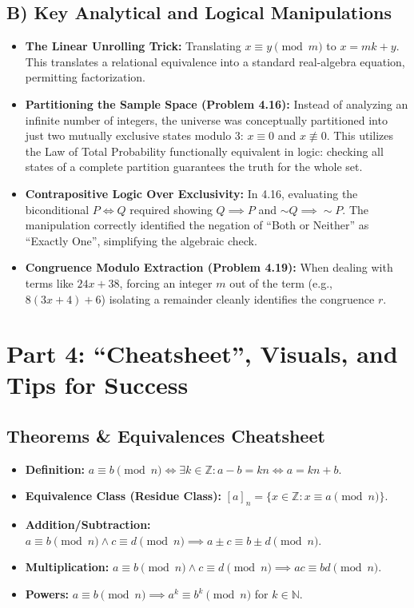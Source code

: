 \documentclass[11pt]{article}
\begin{document}
\subsection{B) Key Analytical and Logical Manipulations}
\begin{itemize}
    \item \textbf{The Linear Unrolling Trick:} Translating $x \equiv y \pmod m$ to $x = mk + y$. This translates a relational equivalence into a standard real-algebra equation, permitting factorization.
    \item \textbf{Partitioning the Sample Space (Problem 4.16):} Instead of analyzing an infinite number of integers, the universe was conceptually partitioned into just two mutually exclusive states modulo 3: $x \equiv 0$ and $x \not\equiv 0$. This utilizes the Law of Total Probability functionally equivalent in logic: checking all states of a complete partition guarantees the truth for the whole set.
    \item \textbf{Contrapositive Logic Over Exclusivity:} In 4.16, evaluating the biconditional $P \iff Q$ required showing $Q \implies P$ and $\sim Q \implies \sim P$. The manipulation correctly identified the negation of ``Both or Neither'' as ``Exactly One'', simplifying the algebraic check.
    \item \textbf{Congruence Modulo Extraction (Problem 4.19):} When dealing with terms like $24x + 38$, forcing an integer $m$ out of the term (e.g., $8(3x + 4) + 6$) isolating a remainder cleanly identifies the congruence $r$.
\end{itemize}

\newpage
\section{Part 4: ``Cheatsheet'', Visuals, and Tips for Success}

\subsection{Theorems \& Equivalences Cheatsheet}
\begin{itemize}
    \item \textbf{Definition:} $a \equiv b \pmod n \iff \exists k \in \mathbb{Z} : a - b = kn \iff a = kn + b$.
    \item \textbf{Equivalence Class (Residue Class):} $[a]_n = \{ x \in \mathbb{Z} : x \equiv a \pmod n \}$.
    \item \textbf{Addition/Subtraction:} $a \equiv b \pmod n \land c \equiv d \pmod n \implies a \pm c \equiv b \pm d \pmod n$.
    \item \textbf{Multiplication:} $a \equiv b \pmod n \land c \equiv d \pmod n \implies ac \equiv bd \pmod n$.
    \item \textbf{Powers:} $a \equiv b \pmod n \implies a^k \equiv b^k \pmod n$ for $k \in \mathbb{N}$.
\end{itemize}
\end{document}
